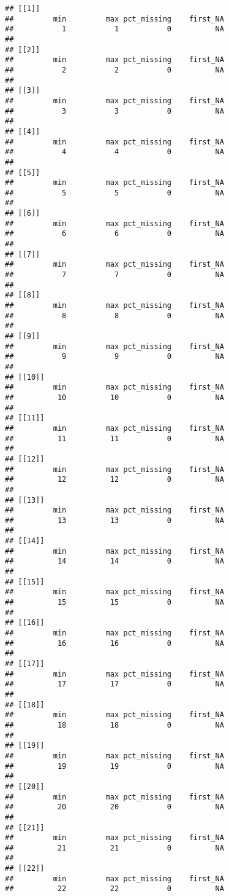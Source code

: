 \documentclass[
]{article}
\begin{document}
\begin{verbatim}
## [[1]]
##         min         max pct_missing    first_NA 
##           1           1           0          NA 
## 
## [[2]]
##         min         max pct_missing    first_NA 
##           2           2           0          NA 
## 
## [[3]]
##         min         max pct_missing    first_NA 
##           3           3           0          NA 
## 
## [[4]]
##         min         max pct_missing    first_NA 
##           4           4           0          NA 
## 
## [[5]]
##         min         max pct_missing    first_NA 
##           5           5           0          NA 
## 
## [[6]]
##         min         max pct_missing    first_NA 
##           6           6           0          NA 
## 
## [[7]]
##         min         max pct_missing    first_NA 
##           7           7           0          NA 
## 
## [[8]]
##         min         max pct_missing    first_NA 
##           8           8           0          NA 
## 
## [[9]]
##         min         max pct_missing    first_NA 
##           9           9           0          NA 
## 
## [[10]]
##         min         max pct_missing    first_NA 
##          10          10           0          NA 
## 
## [[11]]
##         min         max pct_missing    first_NA 
##          11          11           0          NA 
## 
## [[12]]
##         min         max pct_missing    first_NA 
##          12          12           0          NA 
## 
## [[13]]
##         min         max pct_missing    first_NA 
##          13          13           0          NA 
## 
## [[14]]
##         min         max pct_missing    first_NA 
##          14          14           0          NA 
## 
## [[15]]
##         min         max pct_missing    first_NA 
##          15          15           0          NA 
## 
## [[16]]
##         min         max pct_missing    first_NA 
##          16          16           0          NA 
## 
## [[17]]
##         min         max pct_missing    first_NA 
##          17          17           0          NA 
## 
## [[18]]
##         min         max pct_missing    first_NA 
##          18          18           0          NA 
## 
## [[19]]
##         min         max pct_missing    first_NA 
##          19          19           0          NA 
## 
## [[20]]
##         min         max pct_missing    first_NA 
##          20          20           0          NA 
## 
## [[21]]
##         min         max pct_missing    first_NA 
##          21          21           0          NA 
## 
## [[22]]
##         min         max pct_missing    first_NA 
##          22          22           0          NA 

\end{verbatim}
\end{document}
